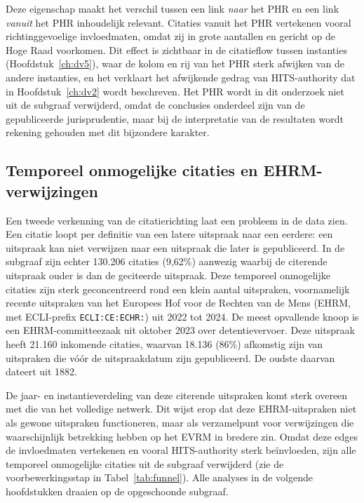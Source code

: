 \documentclass[a4paper, 12pt]{report}
\begin{document}
Deze eigenschap maakt het verschil tussen een link \emph{naar} het PHR en een link \emph{vanuit} het PHR inhoudelijk relevant. Citaties vanuit het PHR vertekenen vooral richtinggevoelige invloedmaten, omdat zij in grote aantallen en gericht op de Hoge Raad voorkomen. Dit effect is zichtbaar in de citatieflow tussen instanties (Hoofdstuk~\ref{ch:dv5}), waar de kolom en rij van het PHR sterk afwijken van de andere instanties, en het verklaart het afwijkende gedrag van HITS-authority dat in Hoofdstuk~\ref{ch:dv2} wordt beschreven. Het PHR wordt in dit onderzoek niet uit de subgraaf verwijderd, omdat de conclusies onderdeel zijn van de gepubliceerde jurisprudentie, maar bij de interpretatie van de resultaten wordt rekening gehouden met dit bijzondere karakter.


\subsection{Temporeel onmogelijke citaties en EHRM-verwijzingen}
\label{sec:eda}
Een tweede verkenning van de citatierichting laat een probleem in de data zien. Een citatie loopt per definitie van een latere uitspraak naar een eerdere: een uitspraak kan niet verwijzen naar een uitspraak die later is gepubliceerd. In de subgraaf zijn echter 130.206 citaties (9,62\%) aanwezig waarbij de citerende uitspraak ouder is dan de geciteerde uitspraak. Deze temporeel onmogelijke citaties zijn sterk geconcentreerd rond een klein aantal uitspraken, voornamelijk recente uitspraken van het Europees Hof voor de Rechten van de Mens (EHRM, met ECLI-prefix \texttt{ECLI:CE:ECHR:}) uit 2022 tot 2024. De meest opvallende knoop is een EHRM-committeezaak uit oktober 2023 over detentievervoer. Deze uitspraak heeft 21.160 inkomende citaties, waarvan 18.136 (86\%) afkomstig zijn van uitspraken die vóór de uitspraakdatum zijn gepubliceerd. De oudste daarvan dateert uit 1882.

De jaar- en instantieverdeling van deze citerende uitspraken komt sterk overeen met die van het volledige netwerk. Dit wijst erop dat deze EHRM-uitspraken niet als gewone uitspraken functioneren, maar als verzamelpunt voor verwijzingen die waarschijnlijk betrekking hebben op het EVRM in bredere zin. Omdat deze edges de invloedmaten vertekenen en vooral HITS-authority sterk beïnvloeden, zijn alle temporeel onmogelijke citaties uit de subgraaf verwijderd (zie de voorbewerkingsstap in Tabel~\ref{tab:funnel}). Alle analyses in de volgende hoofdstukken draaien op de opgeschoonde subgraaf.
\end{document}
